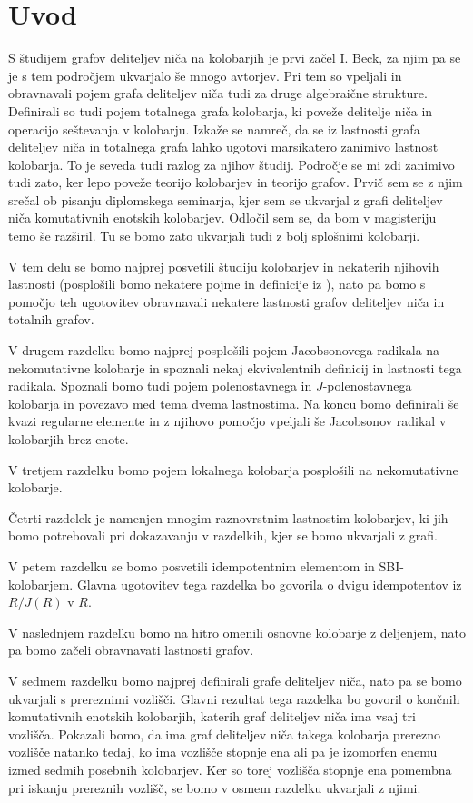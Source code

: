 \documentclass[a4paper, 12pt]{amsart}
\theoremstyle{definition} %
\theoremstyle{plain} %
\begin{document}
\setcounter{page}{1}
\section{Uvod}
S študijem grafov deliteljev niča na kolobarjih je prvi začel I. Beck, za njim pa se je s tem področjem ukvarjalo še mnogo avtorjev. Pri tem so vpeljali in obravnavali pojem grafa deliteljev niča tudi za druge algebraične strukture. Definirali so tudi pojem totalnega grafa kolobarja, ki poveže delitelje niča in operacijo seštevanja v kolobarju. Izkaže se namreč, da se iz lastnosti grafa deliteljev niča in totalnega grafa lahko ugotovi marsikatero zanimivo lastnost kolobarja. To je seveda tudi razlog za njihov študij.  Področje se mi zdi zanimivo tudi zato, ker lepo poveže teorijo kolobarjev in teorijo grafov. Prvič sem se z njim srečal ob pisanju diplomskega seminarja, kjer sem se ukvarjal z grafi deliteljev niča komutativnih enotskih kolobarjev. Odločil sem se, da bom v magisteriju temo še razširil. Tu se bomo zato ukvarjali tudi z bolj splošnimi kolobarji. 

V tem delu se bomo najprej posvetili študiju kolobarjev in nekaterih njihovih lastnosti (posplošili bomo nekatere pojme in definicije iz \cite{diploma}), nato pa bomo s pomočjo teh ugotovitev obravnavali nekatere lastnosti grafov deliteljev niča in totalnih grafov.

V drugem razdelku bomo najprej posplošili pojem Jacobsonovega radikala na nekomutativne kolobarje in spoznali nekaj ekvivalentnih definicij in lastnosti tega radikala. Spoznali bomo tudi pojem polenostavnega in $J$-polenostavnega kolobarja in povezavo med tema dvema lastnostima. Na koncu bomo definirali še kvazi regularne elemente in z njihovo pomočjo vpeljali še Jacobsonov radikal v kolobarjih brez enote.

V tretjem razdelku bomo pojem lokalnega kolobarja posplošili na nekomutativne kolobarje.

Četrti razdelek je namenjen mnogim raznovrstnim lastnostim kolobarjev, ki jih bomo potrebovali pri dokazavanju v razdelkih, kjer se bomo ukvarjali z grafi.

V petem razdelku se bomo posvetili idempotentnim elementom in SBI-kolobarjem. Glavna ugotovitev tega razdelka bo govorila o dvigu idempotentov iz $R/J(R)$ v $R$.

V naslednjem razdelku bomo na hitro omenili osnovne kolobarje z deljenjem, nato pa bomo začeli obravnavati lastnosti grafov.

V sedmem razdelku bomo najprej definirali grafe deliteljev niča, nato pa se bomo ukvarjali s prereznimi vozlišči. Glavni rezultat tega razdelka bo govoril o končnih komutativnih enotskih kolobarjih, katerih graf deliteljev niča ima vsaj tri vozlišča. Pokazali bomo, da ima graf deliteljev niča takega kolobarja prerezno vozlišče natanko tedaj, ko ima vozlišče stopnje ena ali pa je izomorfen enemu izmed sedmih posebnih kolobarjev. Ker so torej vozlišča stopnje ena pomembna pri iskanju prereznih vozlišč, se bomo v osmem razdelku ukvarjali z njimi.
\end{document}
